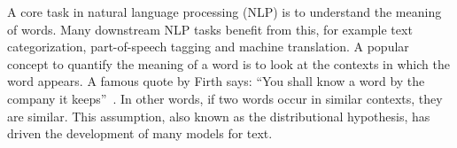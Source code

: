 \documentclass[
        a4paper,
        titlepage,
        twoside,
        parskip,
        numbers=noenddot
        ]{scrbook}
\theoremstyle{break}
\begin{document}

A core task in natural language processing (NLP) is to understand the meaning of words.
Many downstream NLP tasks benefit from this, for example text categorization, part-of-speech tagging and machine translation.
A popular concept to quantify the meaning of a word is to look at the contexts in which the word appears.
A famous quote by Firth says: ``You shall know a word by the company it keeps''~\cite{Firth1957}.
In other words, if two words occur in similar contexts, they are similar.
This assumption, also known as the distributional hypothesis, has driven the development of many models for text.
\end{document}

